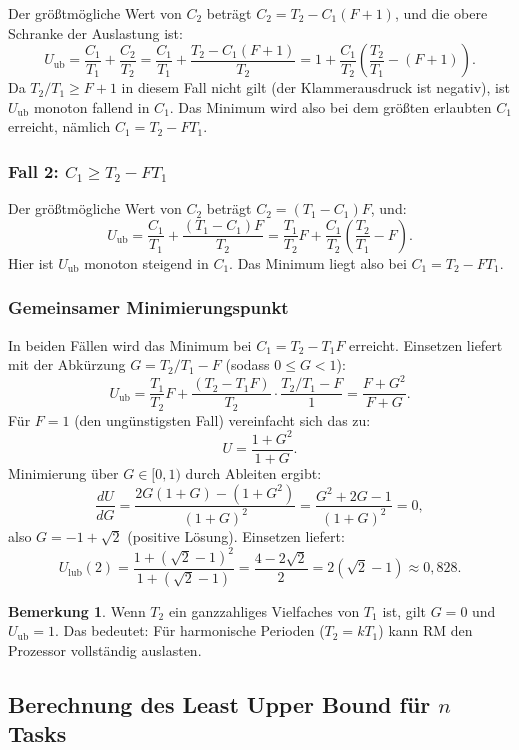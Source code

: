 ﻿\documentclass[a4paper,12pt]{report}
\theoremstyle{definition}
\newtheorem{bemerkung}{Bemerkung}[chapter]
\begin{document}
Der größtmögliche Wert von $C_2$ beträgt $C_2 = T_2 - C_1(F+1)$, und die
obere Schranke der Auslastung ist:
\[
	U_{\text{ub}} = \frac{C_1}{T_1} + \frac{C_2}{T_2}
	= \frac{C_1}{T_1} + \frac{T_2 - C_1(F+1)}{T_2}
	= 1 + \frac{C_1}{T_2}\left(\frac{T_2}{T_1} - (F+1)\right).
\]
Da $T_2/T_1 \geq F + 1$ in diesem Fall nicht gilt (der Klammerausdruck ist negativ),
ist $U_{\text{ub}}$ monoton fallend in $C_1$. Das Minimum wird also bei dem größten
erlaubten $C_1$ erreicht, nämlich $C_1 = T_2 - F T_1$.

\subsubsection{Fall 2: $C_1 \geq T_2 - F T_1$}

Der größtmögliche Wert von $C_2$ beträgt $C_2 = (T_1 - C_1) F$, und:
\[
	U_{\text{ub}} = \frac{C_1}{T_1} + \frac{(T_1 - C_1)F}{T_2}
	= \frac{T_1}{T_2} F + \frac{C_1}{T_2}\left(\frac{T_2}{T_1} - F\right).
\]
Hier ist $U_{\text{ub}}$ monoton steigend in $C_1$. Das Minimum liegt also bei
$C_1 = T_2 - F T_1$.

\subsubsection{Gemeinsamer Minimierungspunkt}

In beiden Fällen wird das Minimum bei $C_1 = T_2 - T_1 F$ erreicht. Einsetzen liefert
mit der Abkürzung $G = T_2/T_1 - F$ (sodass $0 \leq G < 1$):
\[
	U_{\text{ub}} = \frac{T_1}{T_2}F + \frac{(T_2 - T_1 F)}{T_2}
	\cdot\frac{T_2/T_1 - F}{1}
	= \frac{F + G^2}{F + G}.
\]
Für $F = 1$ (den ungünstigsten Fall) vereinfacht sich das zu:
\[
	U = \frac{1 + G^2}{1 + G}.
\]
Minimierung über $G \in [0,1)$ durch Ableiten ergibt:
\[
	\frac{dU}{dG} = \frac{2G(1+G) - (1+G^2)}{(1+G)^2} = \frac{G^2 + 2G - 1}{(1+G)^2} = 0,
\]
also $G = -1 + \sqrt{2}$ (positive Lösung). Einsetzen liefert:
\[
	U_{\text{lub}}(2) = \frac{1 + (\sqrt{2}-1)^2}{1 + (\sqrt{2}-1)}
	= \frac{4 - 2\sqrt{2}}{2} = 2(\sqrt{2} - 1) \approx 0{,}828.
\]

\begin{bemerkung}
	Wenn $T_2$ ein ganzzahliges Vielfaches von $T_1$ ist, gilt $G = 0$ und
	$U_{\text{ub}} = 1$. Das bedeutet: Für harmonische Perioden ($T_2 = k T_1$)
	kann RM den Prozessor vollständig auslasten.
\end{bemerkung}

\subsection{Berechnung des Least Upper Bound für $n$ Tasks}
\end{document}

